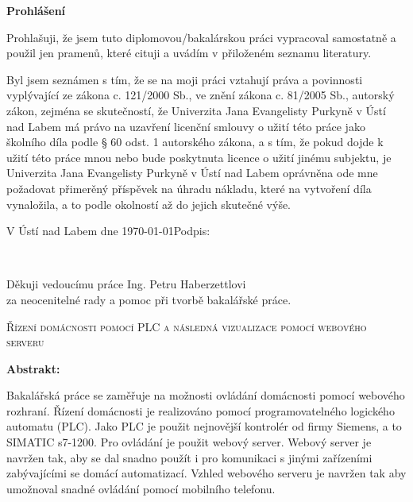 \documentclass[a4paper,12pt,czech,bibliography=totoc]{scrbook}
\newcommand{\nazevcz}{{Řízení domácnosti pomocí PLC a následná vizualizace pomocí webového serveru}}        %
\begin{document}
\cleardoublepage

\thispagestyle{empty} 
{\bfseries Prohlášení} %

\vspace{0.5cm} %
Prohlašuji, že jsem tuto diplomovou/bakalárskou práci vypracoval
samostatně a použil
jen pramenů, které cituji a uvádím v přiloženém seznamu literatury.

\vspace{0.5em}

Byl jsem seznámen 
s tím, že se na moji práci vztahují práva a povinnosti vyplývající ze
zákona c. 121/2000 Sb., ve znění zákona c. 81/2005 Sb., autorský zákon, zejména se
skutečností, že Univerzita Jana Evangelisty Purkyně v Ústí nad Labem má právo na uzavření
licenční smlouvy o užití této práce jako školního díla podle § 60 odst. 1 autorského zákona, a
s tím, že pokud dojde k užití této práce mnou nebo bude poskytnuta licence o užití jinému
subjektu, je Univerzita Jana Evangelisty Purkyně v Ústí nad Labem oprávněna ode mne
požadovat přimerěný příspěvek na úhradu nákladu, které na vytvoření díla vynaložila, a to
podle okolností až do jejich skutečné výše.

\vspace{2em}

V Ústí nad Labem dne \today   \hfill Podpis: \makebox[3cm][s]{\dotfill}

\cleardoublepage
\thispagestyle{empty}
~
\vfill

\begin{flushright}
    Děkuji vedoucímu práce Ing. Petru Haberzettlovi \\ 
    za neocenitelné rady a pomoc při tvorbě bakalářské práce.
\end{flushright}

\cleardoublepage

\textsc{\nazevcz}

\textbf{Abstrakt:}

Bakalářská práce se zaměřuje na možnosti ovládání domácnosti pomocí webového rozhraní. Řízení domácnosti je realizováno pomocí programovatelného logického automatu (PLC). Jako PLC je použit nejnovější kontrolér od firmy Siemens, a to SIMATIC s7-1200. Pro ovládání je použit webový server. Webový server je navržen tak, aby se dal snadno použít i pro komunikaci s jinými zařízeními zabývajícími se domácí automatizací. Vzhled webového serveru je navržen tak aby umožnoval snadné ovládání pomocí mobilního telefonu.
\end{document}
